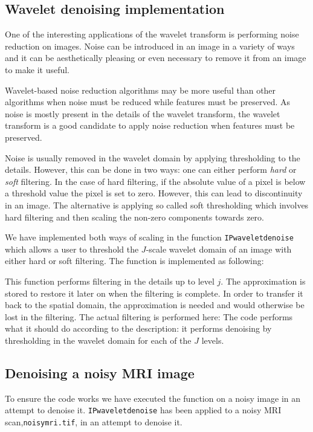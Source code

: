 \subsection{Wavelet denoising implementation}
One of the interesting applications of the wavelet transform is performing noise reduction on images.
Noise can be introduced in an image in a variety of ways and it can be aesthetically pleasing or even necessary to remove it from an image to make it useful.

Wavelet-based noise reduction algorithms may be more useful than other algorithms when noise must be reduced while features must be preserved.
As noise is mostly present in the details of the wavelet transform, the wavelet transform is a good candidate to apply noise reduction when features must be preserved.

Noise is usually removed in the wavelet domain by applying thresholding to the details. However, this can be done in two ways: one can either perform \textit{hard} or \textit{soft} filtering. In the case of hard filtering, if the absolute value of a pixel is below a threshold value the pixel is set to zero. However, this can lead to discontinuity in an image. The alternative is applying so called soft thresholding which involves hard filtering and then scaling the non-zero components towards zero. 

We have implemented both ways of scaling in the function \texttt{IPwaveletdenoise} which allows a user to threshold the $J$-scale wavelet domain of an image with either hard or soft filtering. The function is implemented as following:

This function performs filtering in the details up to level $j$. The approximation is stored to restore it later on when the filtering is complete. In order to transfer it back to the spatial domain, the approximation is needed and would otherwise be lost in the filtering. 
The actual filtering is performed here:
The code performs what it should do according to the description: it performs denoising by thresholding in the wavelet domain for each of the \(J\) levels. 

\subsection{Denoising a noisy MRI image}
To ensure the code works we have executed the function on a noisy image in an attempt to denoise it.
\texttt{IPwaveletdenoise} has been applied to a noisy MRI scan,\texttt{noisymri.tif}, in an attempt to denoise it.


